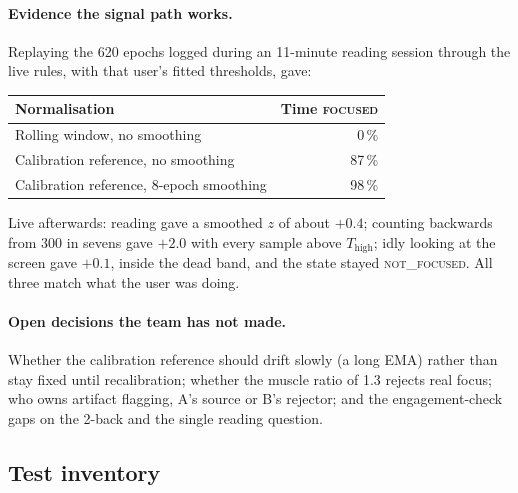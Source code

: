 \documentclass[10pt,a4paper]{article}
\newcommand{\state}[1]{\textsc{\small #1}}          %
\newcommand{\Thigh}{T_{\mathrm{high}}}
\begin{document}
\paragraph{Evidence the signal path works.} Replaying the 620 epochs logged during an 11-minute
reading session through the live rules, with that user's fitted thresholds, gave:

\begin{center}\small
\begin{tabular}{@{}l r@{}}
\toprule
\textbf{Normalisation} & \textbf{Time \state{focused}} \\
\midrule
Rolling window, no smoothing & 0\,\% \\
Calibration reference, no smoothing & 87\,\% \\
Calibration reference, 8-epoch smoothing & 98\,\% \\
\bottomrule
\end{tabular}
\end{center}

Live afterwards: reading gave a smoothed $z$ of about $+0.4$; counting backwards from 300 in
sevens gave $+2.0$ with every sample above $\Thigh$; idly looking at the screen gave $+0.1$, inside
the dead band, and the state stayed \state{not\_focused}. All three match what the user was doing.

\paragraph{Open decisions the team has not made.} Whether the calibration reference should drift
slowly (a long EMA) rather than stay fixed until recalibration; whether the muscle ratio of 1.3
rejects real focus; who owns artifact flagging, A's source or B's rejector; and the
engagement-check gaps on the 2-back and the single reading question.

\subsection{Test inventory}
\end{document}
